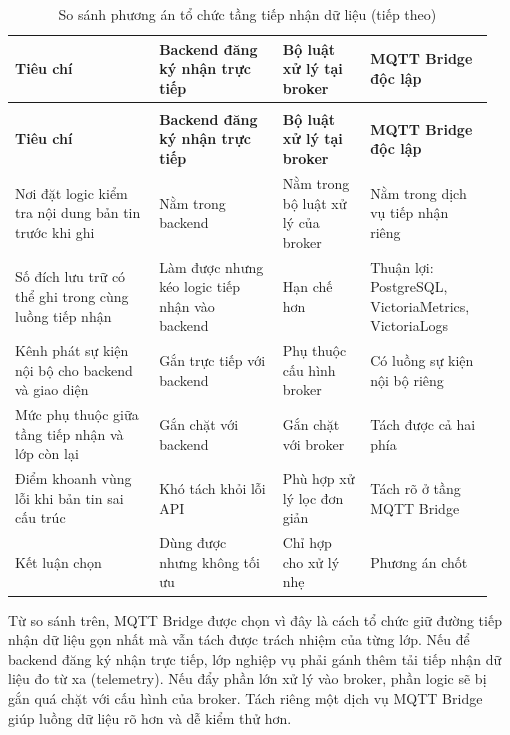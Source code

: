 \documentclass[a4paper]{extarticle}
\newcommand{\thesissettableid}[2]{%
  \renewcommand{\thetable}{#1}%
  \renewcommand{\theHtable}{#2}%
}
\begin{document}
{\thesissettableid{3.31}{condensed-bang-3-31-so-sanh-phuong-an-to-chuc-tang-tiep-nhan-du-lieu}
\def\LTcaptype{table}
\begin{longtable}{|L{0.286\linewidth}|L{0.246\linewidth}|L{0.179\linewidth}|L{0.241\linewidth}|}
\caption{So sánh phương án tổ chức tầng tiếp nhận dữ liệu}\label{tab:condensed-bang-3-31-so-sanh-phuong-an-to-chuc-tang-tiep-nhan-du-lieu}\\
\hline
\textbf{Tiêu chí} & \textbf{Backend đăng ký nhận trực tiếp} & \textbf{Bộ luật xử lý tại broker} & \textbf{MQTT Bridge độc lập} \\
\hline
\endfirsthead
\caption[]{So sánh phương án tổ chức tầng tiếp nhận dữ liệu (tiếp theo)}\\
\hline
\textbf{Tiêu chí} & \textbf{Backend đăng ký nhận trực tiếp} & \textbf{Bộ luật xử lý tại broker} & \textbf{MQTT Bridge độc lập} \\
\hline
\endhead
\endfoot
\endlastfoot
Nơi đặt logic kiểm tra nội dung bản tin trước khi ghi & Nằm trong backend & Nằm trong bộ luật xử lý của broker & Nằm trong dịch vụ tiếp nhận riêng \\\hline
Số đích lưu trữ có thể ghi trong cùng luồng tiếp nhận & Làm được nhưng kéo logic tiếp nhận vào backend & Hạn chế hơn & Thuận lợi: PostgreSQL, VictoriaMetrics, VictoriaLogs \\\hline
Kênh phát sự kiện nội bộ cho backend và giao diện & Gắn trực tiếp với backend & Phụ thuộc cấu hình broker & Có luồng sự kiện nội bộ riêng \\\hline
Mức phụ thuộc giữa tầng tiếp nhận và lớp còn lại & Gắn chặt với backend & Gắn chặt với broker & Tách được cả hai phía \\\hline
Điểm khoanh vùng lỗi khi bản tin sai cấu trúc & Khó tách khỏi lỗi API & Phù hợp xử lý lọc đơn giản & Tách rõ ở tầng MQTT Bridge \\\hline
Kết luận chọn & Dùng được nhưng không tối ưu & Chỉ hợp cho xử lý nhẹ & Phương án chốt \\\hline
\end{longtable}
}

Từ so sánh trên, MQTT Bridge được chọn vì đây là cách tổ chức giữ đường tiếp
nhận dữ liệu gọn nhất mà vẫn tách được trách nhiệm của từng lớp. Nếu để backend
đăng ký nhận trực tiếp, lớp nghiệp vụ phải gánh thêm tải tiếp nhận dữ liệu đo từ xa (telemetry).
Nếu đẩy phần lớn xử lý vào broker, phần logic sẽ bị gắn quá chặt với cấu hình
của broker. Tách riêng một dịch vụ MQTT Bridge giúp luồng dữ liệu rõ hơn và dễ
kiểm thử hơn.
\end{document}
